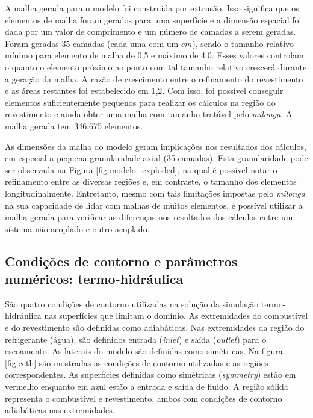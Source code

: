 A malha gerada para o modelo foi construída por extrusão. Isso significa que
os elementos de malha foram gerados para uma superfície e a dimensão espacial
foi dada por um valor de comprimento e um número de camadas a serem geradas.
Foram geradas 35 camadas (cada uma com um $cm$), sendo o tamanho relativo
mínimo para elemento de malha de 0,5 e máximo de 4.0. Esses valores controlam
o quanto o elemento próximo ao ponto com tal tamanho relativo crescerá durante
a geração da malha. A razão de crescimento entre o refinamento do revestimento
e as áreas restantes foi estabelecido em 1,2. Com isso, foi possível conseguir
elementos suficientemente pequenos para realizar os cálculos na região
do revestimento e ainda obter uma malha com tamanho tratável pelo \textit{milonga}.
A malha gerada tem 346.675 elementos.

As dimensões da malha do modelo geram implicações nos resultados dos cálculos, em
especial a pequena granularidade axial (35 camadas). Esta granularidade
pode ser observada na Figura \ref{fig:modelo_exploded},
na qual é possível notar
o refinamento entre as diversas regiões e, em contraste, o tamanho dos elementos longitudinalmente.
Entretanto, mesmo com tais
limitações impostas pelo \textit{milonga} na sua capacidade de lidar
com malhas de muitos elementos, é possível utilizar a malha gerada para verificar
as diferenças nos resultados dos cálculos entre um sistema não acoplado e outro acoplado.


\subsection{Condições de contorno e parâmetros numéricos: termo-hidráulica}
\label{subsec:ccth}


São quatro condições de contorno utilizadas na solução da simulação termo-hidráulica
nas superfícies que limitam o domínio. As extremidades do combustível e do revestimento
são definidas como adiabáticas. Nas
extremidades da região do refrigerante (água), são definidos entrada (\textit{inlet}) e
saída (\textit{outlet}) para o escoamento. As laterais do modelo são definidas
como simétricas. Na figura \ref{fig:ccth} são mostradas as condições de contorno
utilizadas e as regiões correspondentes. As superfícies definidas como simétricas (\textit{symmetry})
estão em vermelho
enquanto em azul estão a entrada e saída de fluido. A região sólida representa o
combustível e revestimento, ambos com condições de contorno adiabáticas nas extremidades.

